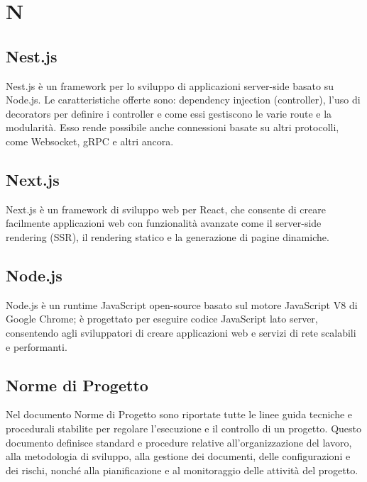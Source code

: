\section{N} 
\subsection{Nest.js} 
Nest.js è un framework per lo sviluppo di applicazioni server-side basato su Node.js. Le caratteristiche offerte sono: dependency injection (controller), l'uso di decorators per definire i controller e come essi gestiscono le varie route e la modularità. Esso rende possibile anche connessioni basate su altri protocolli, come Websocket, gRPC e altri ancora.
\subsection{Next.js} 
Next.js è un framework di sviluppo web per React, che consente di creare facilmente applicazioni web con funzionalità avanzate come il server-side rendering (SSR), il rendering statico e la generazione di pagine dinamiche.
\subsection{Node.js} 
Node.js è un runtime JavaScript open-source basato sul motore JavaScript V8 di Google Chrome; è progettato per eseguire codice JavaScript lato server, consentendo agli sviluppatori di creare applicazioni web e servizi di rete scalabili e performanti.
\subsection{Norme di Progetto} 
Nel documento Norme di Progetto sono riportate tutte le linee guida tecniche e procedurali stabilite per regolare l'esecuzione e il controllo di un progetto. Questo documento definisce standard e procedure relative all'organizzazione del lavoro, alla metodologia di sviluppo, alla gestione dei documenti, delle configurazioni e dei rischi, nonché alla pianificazione e al monitoraggio delle attività del progetto.
